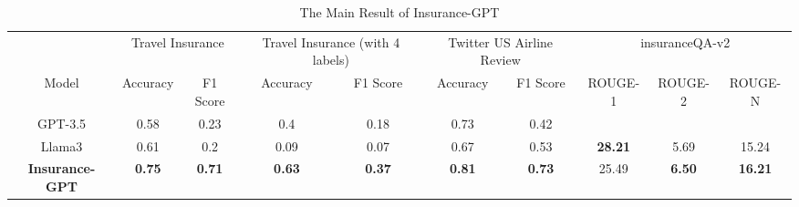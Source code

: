 \documentclass[conference]{IEEEtran}
\begin{document}
\begin{table}[h!]
\caption{The Main Result of Insurance-GPT}

\label{baseline}
\fontsize{8pt}{13pt}\selectfont %
\begin{tabular}{cccccccccc}
\toprule
                                              & \multicolumn{2}{c}{Travel Insurance}                                        & \multicolumn{2}{c}{Travel Insurance (with 4 labels)}                         & \multicolumn{2}{c}{Twitter US Airline Review}                               & \multicolumn{3}{c}{insuranceQA-v2}                                                                                   \\ \cline{2-10} 
\multirow{-2}{*}{Model}                       & Accuracy                             & F1 Score                             & Accuracy                             & F1 Score                             & Accuracy                             & F1 Score                             & ROUGE-1                               & ROUGE-2                              & ROUGE-N                               \\ \hline
GPT-3.5                                       & 0.58                                 & 0.23                                 & 0.4                                  & 0.18                                 & 0.73                                 & 0.42                                 &                                       &                                      &                                       \\
Llama3                                        & 0.61                                 & 0.2                                  & 0.09                                 & 0.07                                 & 0.67                                 & 0.53                                 & {\color[HTML]{CB0000} \textbf{28.21}} & 5.69                                 & 15.24                                 \\
{\color[HTML]{000000} \textbf{Insurance-GPT}} & {\color[HTML]{CB0000} \textbf{0.75}} & {\color[HTML]{CB0000} \textbf{0.71}} & {\color[HTML]{CB0000} \textbf{0.63}} & {\color[HTML]{CB0000} \textbf{0.37}} & {\color[HTML]{CB0000} \textbf{0.81}} & {\color[HTML]{CB0000} \textbf{0.73}} & 25.49                                 & {\color[HTML]{CB0000} \textbf{6.50}} & {\color[HTML]{CB0000} \textbf{16.21}} \\ \toprule
\end{tabular}

\end{table}
\end{document}
